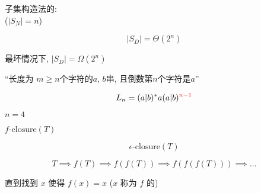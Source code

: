 %

\begin{frame}{}
  \begin{center}
    子集构造法的: \\
    ($|S_{N}| = n$)

    \[
      |S_{D}| = \Theta(2^n)
    \]

    \vspace{0.30cm}
    最坏情况下, $|S_{D}| = \Omega(2^n)$
  \end{center}
\end{frame}

\begin{frame}{}
  \begin{center}
    ``长度为 $m \ge n$个字符的$a$, $b$串, 且倒数第$n$个字符是$a$''

    \pause
    \[
      L_{n} = (a | b)^{\ast} a (a | b)^{\textcolor{red}{n-1}}
    \]

    \pause

    \pause
    \vspace{0.30cm}
    $n = 4$
  \end{center}
\end{frame}

\begin{frame}{}
\end{frame}

\begin{frame}{}
  \begin{center}
     $f\text{-closure}(T)$

    \pause
    \[
      \epsilon\text{-closure}(T)
    \]

    \pause
    \[
      T \implies f(T) \implies f(f(T)) \implies f(f(f(T))) \implies \dots
    \]

    \pause
    直到找到 $x$ 使得 $f(x) = x$ ($x$ 称为 $f$ 的)
  \end{center}
\end{frame}
